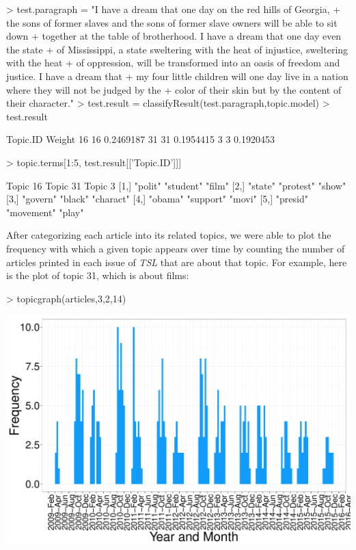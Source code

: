 \documentclass[a4paper]{article}
\begin{document}
\begin{Schunk}
\begin{Sinput}
> test.paragraph = "I have a dream that one day on the red hills of Georgia, 
+ the sons of former slaves and the sons of former slave owners will be able to sit down 
+ together at the table of brotherhood. I have a dream that one day even the state 
+ of Mississippi, a state sweltering with the heat of injustice, sweltering with the heat 
+ of oppression, will be transformed into an oasis of freedom and justice. I have a dream that 
+ my four little children will one day live in a nation where they will not be judged by the 
+ color of their skin but by the content of their character."
> test.result = classifyResult(test.paragraph,topic.model)
> test.result
\end{Sinput}
\begin{Soutput}
   Topic.ID    Weight
16       16 0.2469187
31       31 0.1954415
3         3 0.1920453
\end{Soutput}
\begin{Sinput}
> topic.terms[1:5, test.result[['Topic.ID']]]
\end{Sinput}
\begin{Soutput}
     Topic 16 Topic 31   Topic 3  
[1,] "polit"  "student"  "film"   
[2,] "state"  "protest"  "show"   
[3,] "govern" "black"    "charact"
[4,] "obama"  "support"  "movi"   
[5,] "presid" "movement" "play"   
\end{Soutput}
\end{Schunk}

After categorizing each article into its related topics, we were able to plot the frequency with which a given topic appears over time by counting the number of articles printed in each issue of \textit{TSL} that are about that topic. For example, here is the plot of topic 31, which is about films:

\begin{Schunk}
\begin{Sinput}
> topicgraph(articles,3,2,14)
\end{Sinput}
\end{Schunk}
\includegraphics{FinalProject-005}
\end{document}
